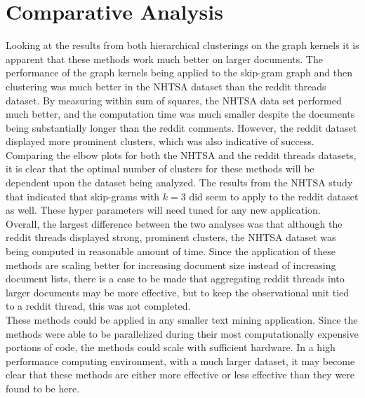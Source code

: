 \section{Comparative Analysis}

Looking at the results from both hierarchical clusterings on the graph kernels it is apparent that these methods work much better on larger documents. The performance of the graph kernels being applied to the skip-gram graph and then clustering was much better in the NHTSA dataset than the reddit threads dataset. By measuring within sum of squares, the NHTSA data set performed much better, and the computation time was much smaller despite the documents being substantially longer than the reddit comments. However, the reddit dataset displayed more prominent clusters, which was also indicative of success.\\
Comparing the elbow plots for both the NHTSA and the reddit threads datasets, it is clear that the optimal number of clusters for these methods will be dependent upon the dataset being analyzed. The results from the NHTSA study that indicated that skip-grams with $k=3$ did seem to apply to the reddit dataset as well. These hyper parameters will need tuned for any new application.\\
Overall, the largest difference between the two analyses was that although the reddit threads displayed strong, prominent clusters, the NHTSA dataset was being computed in reasonable amount of time. Since the application of these methods are scaling better for increasing document size instead of increasing document lists, there is a case to be made that aggregating reddit threads into larger documents may be more effective, but to keep the observational unit tied to a reddit thread, this was not completed.\\ 
These methods could be applied in any smaller text mining application. Since the methods were able to be parallelized during their most computationally expensive portions of code, the methods could scale with sufficient hardware. In a high performance computing environment, with a much larger dataset, it may become clear that these methods are either more effective or less effective than they were found to be here.


 

 


